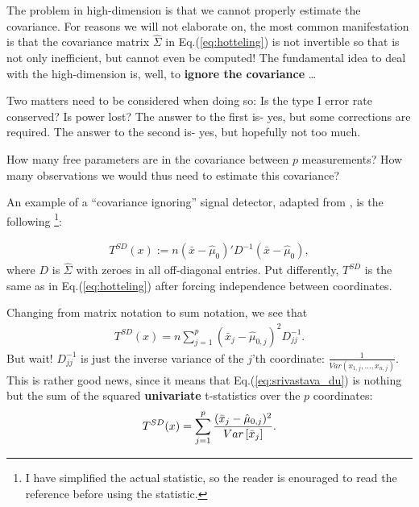 The problem in high-dimension is that we cannot properly estimate the covariance. 
For reasons we will not elaborate on, the most common manifestation is that the covariance matrix $\hat{\Sigma}$ in Eq.(\ref{eq:hotteling}) is not invertible so that \tsq is not only inefficient, but cannot even be computed!
The fundamental idea to deal with the high-dimension is, well, to \textbf{ignore the covariance} \dots

Two matters need to be considered when doing so:
Is the type I error rate conserved?
Is power lost?
The answer to the first is- yes, but some corrections are required.
The answer to the second is- yes, but hopefully not too much.

\begin{think}
How many free parameters are in the covariance between $p$ measurements?
How many observations we would thus need to estimate this covariance?
\end{think} 



An example of a ``covariance ignoring'' signal detector, adapted from \cite{srivastava_test_2008}, is the following \footnote{I have simplified the actual statistic, so the reader is enouraged to read the reference before using the statistic.}:
\begin{definition}
\begin{align}
\label{eq:srivastava_du}
	 	T^{SD}(x) := n (\bar{x}-\hat{\mu}_0)' D^{-1} (\bar{x}-\hat{\mu}_0),
\end{align}
where $D$ is $\hat{\Sigma}$ with zeroes in all off-diagonal entries. Put differently, $T^{SD}$ is the same as \tsq in Eq.(\ref{eq:hotteling}) after forcing independence between coordinates.
\end{definition}
Changing from matrix notation to sum notation, we see that 
\begin{align}
	 	T^{SD}(x) = n \sum_{j=1}^p (\bar{x}_j - \hat{\mu}_{0,j})^2 D^{-1}_{jj} .
\end{align}
But wait! 
$D^{-1}_{jj}$ is just the inverse variance of the $j$'th coordinate: $\frac{1}{Var(x_{1,j},\dots,x_{n,j})}$.
This is rather good news, since it means that Eq.(\ref{eq:srivastava_du}) is nothing but the sum of the squared \textbf{univariate} t-statistics over the $p$ coordinates:
\begin{align}
	 	T^{SD}(x) =  \sum_{j=1}^p \frac{(\bar{x}_j - \hat{\mu}_{0,j})^2}{\mathop{Var} \left[ \bar{x}_j \right]}  .
\end{align}

